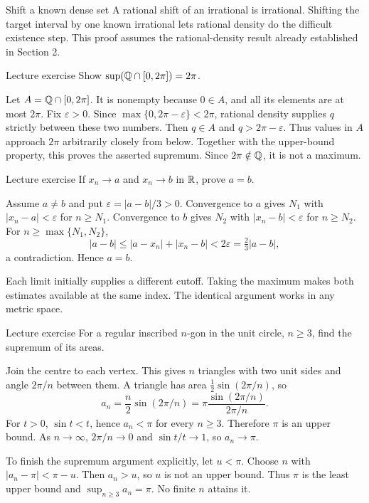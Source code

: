 \begin{method}{Shift a known dense set}
A rational shift of an irrational is irrational. Shifting the target interval by one known irrational lets rational density do the difficult existence step. This proof assumes the rational-density result already established in Section 2.
\end{method}
\begin{exam}{Lecture exercise}
Show $\sup(\mathbb Q\cap[0,2\pi])=2\pi$.
\end{exam}
\begin{answer}
Let $A=\mathbb Q\cap[0,2\pi]$. It is nonempty because $0\in A$, and all its elements are at most $2\pi$. Fix $\varepsilon>0$. Since $\max\{0,2\pi-\varepsilon\}<2\pi$, rational density supplies $q$ strictly between these two numbers. Then $q\in A$ and $q>2\pi-\varepsilon$. Thus values in $A$ approach $2\pi$ arbitrarily closely from below. Together with the upper-bound property, this proves the asserted supremum. Since $2\pi\notin\mathbb Q$, it is not a maximum.
\end{answer}
\begin{exam}{Lecture exercise}
If $x_n\to a$ and $x_n\to b$ in $\mathbb R$, prove $a=b$.
\end{exam}
\begin{answer}
Assume $a\ne b$ and put $\varepsilon=|a-b|/3>0$. Convergence to $a$ gives $N_1$ with $|x_n-a|<\varepsilon$ for $n\ge N_1$. Convergence to $b$ gives $N_2$ with $|x_n-b|<\varepsilon$ for $n\ge N_2$. For $n\ge\max\{N_1,N_2\}$,
\[|a-b|\le|a-x_n|+|x_n-b|<2\varepsilon=\tfrac23|a-b|,\]
a contradiction. Hence $a=b$.
\end{answer}
\begin{tip}
Each limit initially supplies a different cutoff. Taking the maximum makes both estimates available at the same index. The identical argument works in any metric space.
\end{tip}
\begin{exam}{Lecture exercise}
For a regular inscribed $n$-gon in the unit circle, $n\ge3$, find the supremum of its areas.
\end{exam}
\begin{answer}
Join the centre to each vertex. This gives $n$ triangles with two unit sides and angle $2\pi/n$ between them. A triangle has area $\frac12\sin(2\pi/n)$, so
\[a_n=\frac n2\sin(2\pi/n)=\pi\frac{\sin(2\pi/n)}{2\pi/n}.\]
For $t>0$, $\sin t<t$, hence $a_n<\pi$ for every $n\ge3$. Therefore $\pi$ is an upper bound. As $n\to\infty$, $2\pi/n\to0$ and $\sin t/t\to1$, so $a_n\to\pi$.

To finish the supremum argument explicitly, let $u<\pi$. Choose $n$ with $|a_n-\pi|<\pi-u$. Then $a_n>u$, so $u$ is not an upper bound. Thus $\pi$ is the least upper bound and $\sup_{n\ge3}a_n=\pi$. No finite $n$ attains it.
\end{answer}
